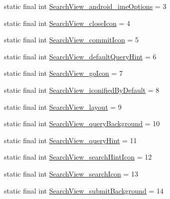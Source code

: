 \begin{DoxyCompactItemize}
\item 
static final int \mbox{\hyperlink{classandroid_1_1support_1_1v7_1_1appcompat_1_1_r_1_1styleable_a86077545d06043426ecaf7b7618bd254}{Search\+View\+\_\+android\+\_\+ime\+Options}} = 3
\item 
static final int \mbox{\hyperlink{classandroid_1_1support_1_1v7_1_1appcompat_1_1_r_1_1styleable_abf9748b43d19825a799c65ba6b586e77}{Search\+View\+\_\+close\+Icon}} = 4
\item 
static final int \mbox{\hyperlink{classandroid_1_1support_1_1v7_1_1appcompat_1_1_r_1_1styleable_ae7eb07c9d9ceef69e24d78377a5f1ab0}{Search\+View\+\_\+commit\+Icon}} = 5
\item 
static final int \mbox{\hyperlink{classandroid_1_1support_1_1v7_1_1appcompat_1_1_r_1_1styleable_a465ed1131f3cdafe7c1d17b3199929ae}{Search\+View\+\_\+default\+Query\+Hint}} = 6
\item 
static final int \mbox{\hyperlink{classandroid_1_1support_1_1v7_1_1appcompat_1_1_r_1_1styleable_ace5391914c505cdcc0735cfccf912402}{Search\+View\+\_\+go\+Icon}} = 7
\item 
static final int \mbox{\hyperlink{classandroid_1_1support_1_1v7_1_1appcompat_1_1_r_1_1styleable_a4bf600d045853eec3e45b543f5095594}{Search\+View\+\_\+iconified\+By\+Default}} = 8
\item 
static final int \mbox{\hyperlink{classandroid_1_1support_1_1v7_1_1appcompat_1_1_r_1_1styleable_a8f8459f4043d888686d7e183aa16a33c}{Search\+View\+\_\+layout}} = 9
\item 
static final int \mbox{\hyperlink{classandroid_1_1support_1_1v7_1_1appcompat_1_1_r_1_1styleable_a0ce53fa8193fd134754564832aad1748}{Search\+View\+\_\+query\+Background}} = 10
\item 
static final int \mbox{\hyperlink{classandroid_1_1support_1_1v7_1_1appcompat_1_1_r_1_1styleable_ab4eafaaa92223b04a9b7ccf85fc6a1ed}{Search\+View\+\_\+query\+Hint}} = 11
\item 
static final int \mbox{\hyperlink{classandroid_1_1support_1_1v7_1_1appcompat_1_1_r_1_1styleable_a3010c7f1c74b2e4acf4bd180367d8a99}{Search\+View\+\_\+search\+Hint\+Icon}} = 12
\item 
static final int \mbox{\hyperlink{classandroid_1_1support_1_1v7_1_1appcompat_1_1_r_1_1styleable_a00804a6c5d19b7fc675d4619bd28ac1a}{Search\+View\+\_\+search\+Icon}} = 13
\item 
static final int \mbox{\hyperlink{classandroid_1_1support_1_1v7_1_1appcompat_1_1_r_1_1styleable_a07a318099f7e9669a82f8a3804296bb5}{Search\+View\+\_\+submit\+Background}} = 14

\end{DoxyCompactItemize}
